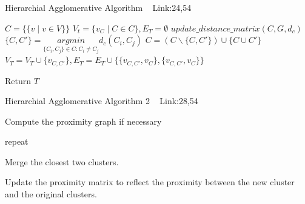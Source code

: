 \documentclass[a4paper]{article}
\begin{document}
  \begin{algorithm}
   \caption{Hierarchial Agglomerative Algorithm ~\cite{haa1} Link:24,54}
    \begin{algorithmic}[1]
     \State $C = \{\{v\mid v \in V\}\} $ 
     \State $V_t = \{v_C\mid C \in C\},E_T = \emptyset$ 
     \State $update\_distance\_matrix(C,G,d_c)$
     \State $\{C,C'\} =  \underset{\{C_i,C_j\} \in C : C_i \neq C_j}{argmin} d_c (C_i,C_j)$
     \State $C = (C \backslash \{C,C'\}) \cup \{C \cup C'\}$ 
     \State $V_T = V_T \cup \{v_{C,C'}\},E_T = E_T \cup \{\{v_{C,C'} ,v_{C}\},\{v_{C,C'} ,v_{C}\}\}$ 
     \EndWhile
    
      
        
       
       \State Return $T$



 

\end{algorithmic}
\end{algorithm}


\begin{algorithm}
   \caption{Hierarchial Agglomerative Algorithm 2 ~\cite{hierarchical1} Link:28,54}
    \begin{algorithmic}[1]
    
       
       
    \State Compute the proximity graph if necessary
    
    \State repeat
    
    \State Merge the closest two clusters.
    
    \State Update the proximity matrix to reflect the proximity between the new cluster and the original
clusters.

 \EndWhile



    
    
    

\end{algorithmic}
\end{algorithm}
\end{document}
